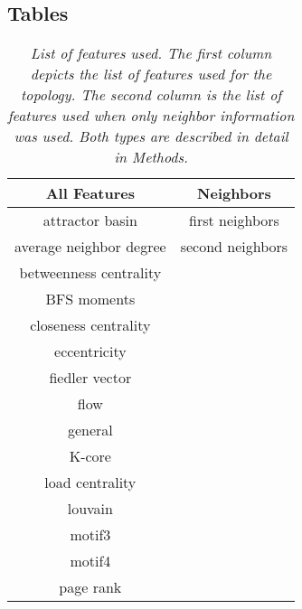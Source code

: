 \subsection*{Tables}

\begin{table}[ht!]
    \centering
    \begin{tabular}{||c c||} 
        \hline
        \textbf{All Features} & \textbf{Neighbors} \\ [0.5ex] 
        \hline\hline
        attractor basin	& first neighbors \\
        \hline
        average neighbor degree	& second neighbors \\
        \hline
        betweenness centrality & \\
        \hline
        BFS moments & \\
        \hline
        closeness centrality & \\
        \hline
        eccentricity & \\
        \hline
        fiedler vector & \\
        \hline
        flow & \\
        \hline
        general & \\
        \hline
        K-core & \\
        \hline
        load centrality & \\
        \hline
        louvain & \\
        \hline
        motif3 & \\
        \hline
        motif4 & \\
        \hline
        page rank & \\ [1ex]
        \hline
    \end{tabular}
    \caption{\textit{List of features used. The first column depicts the list of features used for the topology. The second column is the list of features used when only neighbor information was used. Both types are described in detail in Methods.}}
    \label{tab:features}
\end{table}

